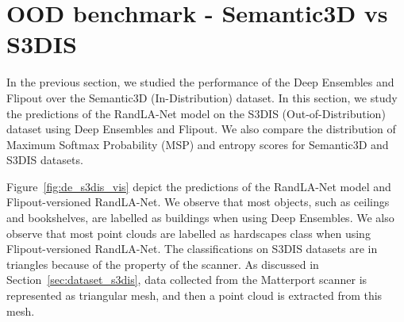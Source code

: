     \section{OOD benchmark - Semantic3D vs S3DIS}
    In the previous section, we studied the performance of the Deep Ensembles and Flipout over the Semantic3D (In-Distribution) dataset.
    In this section, we study the predictions of the RandLA-Net model on the S3DIS (Out-of-Distribution) dataset using Deep Ensembles and Flipout.
    We also compare the distribution of Maximum Softmax Probability (MSP) and entropy scores for Semantic3D and S3DIS datasets.

    Figure~\ref{fig:de_s3dis_vis} depict the predictions of the RandLA-Net model and Flipout-versioned RandLA-Net.
    We observe that most objects, such as ceilings and bookshelves, are labelled as buildings when using Deep Ensembles.
    We also observe that most point clouds are labelled as hardscapes class when using Flipout-versioned RandLA-Net.
    The classifications on S3DIS datasets are in triangles because of the property of the scanner.
    As discussed in Section~\ref{sec:dataset_s3dis}, data collected from the Matterport scanner is represented as triangular mesh, and then a point cloud is extracted from this mesh.

